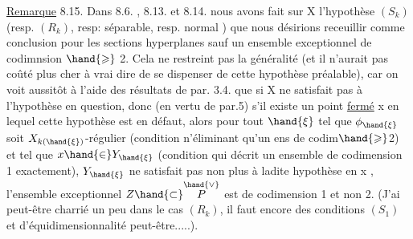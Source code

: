 \uline{Remarque} 8.15. Dans 8.6. , 8.13. et 8.14. nous avons fait sur X
l'hypothèse $(S_k)$ (resp. $(R_k)$, resp: séparable, resp.  normal ) que
nous désirions receuillir comme conclusion pour les sections hyperplanes
sauf  un ensemble exceptionnel de codimnsion $\hand{\geqslant}$ 2. Cela ne restreint
pas la généralité (et il n'aurait pas coûté plus cher à vrai dire
de se dispenser de cette hypothèse préalable), car on voit aussitôt
à l'aide des résultats de par. 3.4.  que si X ne satisfait pas à
l'hypothèse en question, donc (en vertu de par.5) s'il existe un point
\uline{fermé} x en lequel cette hypothèse est en défaut, alors pour tout $\hand{\xi}$ tel
que $\phi_{\hand{\xi}}$ soit $X_{k(\hand{\xi})}$-régulier (condition n'éliminant qu'un ens de codim$\hand{\geqslant}$2)
et tel que $x \hand{\in} Y_{\hand{\xi}}$ (condition qui décrit un ensemble de codimension 1
exactement), $Y_{\hand{\xi}}$ ne satisfait pas non plus à ladite hypothèse en x ,
 l'ensemble exceptionnel $Z \hand{\subset} \overset{\hand{\vee}}{P}$ est de codimension 1 et non 2.
(J'ai peut-être charrié un peu dans le cas $(R_k)$,  il faut encore
des conditions $(S_1)$ et d'équidimensionnalité peut-être.....).

